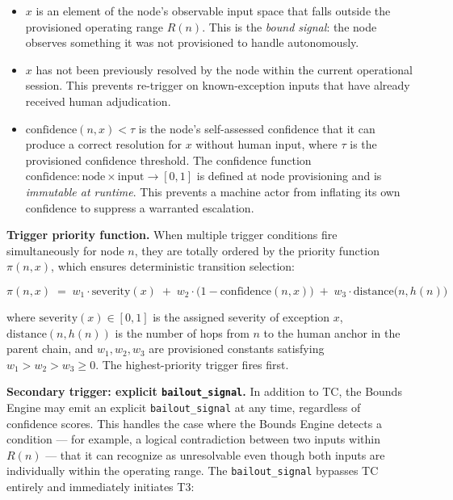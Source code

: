 \begin{itemize}\itemsep=0pt
\item[(i)] $x$ is an element of the node's observable input space that falls outside the provisioned operating range $R(n)$. This is the \emph{bound signal}: the node observes something it was not provisioned to handle autonomously.

\item[(ii)] $x$ has not been previously resolved by the node within the current operational session. This prevents re-trigger on known-exception inputs that have already received human adjudication.

\item[(iii)] $\text{confidence}(n, x) < \tau$ is the node's self-assessed confidence that it can produce a correct resolution for $x$ without human input, where $\tau$ is the provisioned confidence threshold. The confidence function $\text{confidence} : \text{node} \times \text{input} \rightarrow [0, 1]$ is defined at node provisioning and is \emph{immutable at runtime}. This prevents a machine actor from inflating its own confidence to suppress a warranted escalation.
\end{itemize}

\bigskip
\noindent\textbf{Trigger priority function.} When multiple trigger conditions fire simultaneously for node $n$, they are totally ordered by the priority function $\pi(n, x)$, which ensures deterministic transition selection:

\begin{equation}
\pi(n, x) \;=\; w_1 \cdot \text{severity}(x) \;+\; w_2 \cdot \bigl(1 - \text{confidence}(n, x)\bigr) \;+\; w_3 \cdot \text{distance}\bigl(n, h(n)\bigr) \tag{PF}
\end{equation}

where $\text{severity}(x) \in [0, 1]$ is the assigned severity of exception $x$, $\text{distance}(n, h(n))$ is the number of hops from $n$ to the human anchor in the parent chain, and $w_1, w_2, w_3$ are provisioned constants satisfying $w_1 > w_2 > w_3 \geq 0$. The highest-priority trigger fires first.

\bigskip
\noindent\textbf{Secondary trigger: explicit \texttt{bailout\_signal}.} In addition to TC, the Bounds Engine may emit an explicit \texttt{bailout\_signal} at any time, regardless of confidence scores. This handles the case where the Bounds Engine detects a condition --- for example, a logical contradiction between two inputs within $R(n)$ --- that it can recognize as unresolvable even though both inputs are individually within the operating range. The \texttt{bailout\_signal} bypasses TC entirely and immediately initiates T3:

